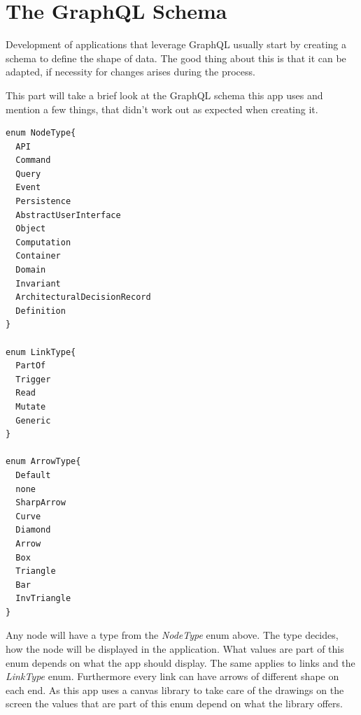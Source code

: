 \section{The GraphQL Schema}
Development of applications that leverage GraphQL usually start by creating a schema to define the shape of data. The good thing about this is that it can be adapted, if necessity for changes arises during the process.

This part will take a brief look at the GraphQL schema this app uses and mention a few things, that didn't work out as expected when creating it.
\lstset{language=GraphQL}
\begin{lstlisting}[caption={GraphQL Enums},label={enums}]
enum NodeType{
  API
  Command
  Query
  Event
  Persistence
  AbstractUserInterface
  Object
  Computation
  Container
  Domain
  Invariant
  ArchitecturalDecisionRecord
  Definition
}

enum LinkType{
  PartOf
  Trigger
  Read
  Mutate
  Generic
}

enum ArrowType{
  Default
  none
  SharpArrow
  Curve
  Diamond
  Arrow
  Box
  Triangle
  Bar
  InvTriangle
}
\end{lstlisting}
Any node will have a type from the \emph{NodeType} enum above. The type decides, how the node will be displayed in the application. What values are part of this enum depends on what the app should display. The same applies to links and the \emph{LinkType} enum. Furthermore every link can have arrows of different shape on each end. As this app uses a canvas library to take care of the drawings on the screen the values that are part of this enum depend on what the library offers.

